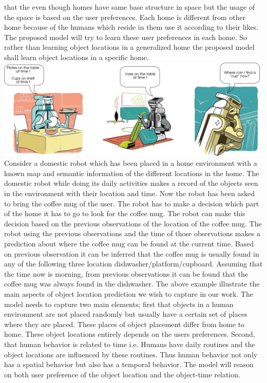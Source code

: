 \documentclass{llncs}
\begin{document}
that the even though homes have same base structure in space but the usage of the space
is based on the user preferences. Each home is different from other home because of the
humans which reside in them use it according to their likes. The proposed model will try to learn these user preferences in each home. So rather than learning object locations in
a generalized home the proposed model shall learn object locations in a specific home.
\includegraphics[width=\textwidth]{scenario.png}
Consider a domestic robot which has been placed in a home environment with a
known map and semantic information of the different locations in the home. The domestic
robot while doing its daily activities makes a record of the objects seen in the environment
with their location and time. Now the robot has been asked to bring the coffee mug of the
user. The robot has to make a decision which part of the home it has to go to look for the
coffee mug. The robot can make this decision based on the previous observations of the
location of the coffee mug. The robot using the previous observations and the time of those
observations makes a prediction about where the coffee mug can be found at the current
time. Based on previous observation it can be inferred that the coffee mug is usually found
in any of the following three location dishwasher/platform/cupboard. Assuming that the
time now is morning, from previous observations it can be found that the coffee mug was
always found in the dishwasher. The above example illustrate the main aspects of object
location prediction we wish to capture in our work.
The model needs to capture two main elements; first that objects in a human environment are not placed randomly but usually have a certain set of places where they are
placed. These places of object placement differ from home to home. These object locations entirely depends on the users preferences. Second, that human behavior is related
to time i.e. Humans have daily routines and the object locations are influenced by these
routines. Thus human behavior not only has a spatial behavior but also has a temporal
behavior. The model will reason on both user preference of the object location and the
object-time relation.
\end{document}
